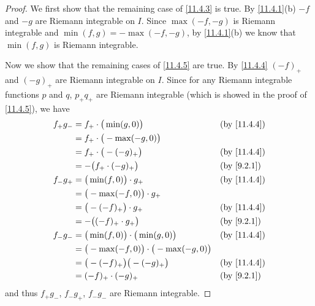 \begin{proof}
  We first show that the remaining case of \cref{11.4.3} is true.
  By \cref{11.4.1}(b) \(-f\) and \(-g\) are Riemann integrable on \(I\).
  Since \(\max(-f, -g)\) is Riemann integrable and \(\min(f, g) = -\max(-f, -g)\), by \cref{11.4.1}(b) we know that \(\min(f, g)\) is Riemann integrable.

  Now we show that the remaining cases of \cref{11.4.5} are true.
  By \cref{11.4.4} \((-f)_+\) and \((-g)_+\) are Riemann integrable on \(I\).
  Since for any Riemann integrable functions \(p\) and \(q\), \(p_+ q_+\) are Riemann integrable (which is showed in the proof of \cref{11.4.5}), we have
  \begin{align*}
    f_+ g_- & = f_+ \cdot \big(\min(g, 0)\big)                      &  & \by{11.4.4} \\
            & = f_+ \cdot \big(-\max(-g, 0)\big)                                     \\
            & = f_+ \cdot \big(-(-g)_+\big)                         &  & \by{11.4.4} \\
            & = -\big(f_+ \cdot (-g)_+\big)                         &  & \by{9.2.1}  \\
    f_- g_+ & = \big(\min(f, 0)\big) \cdot g_+                      &  & \by{11.4.4} \\
            & = \big(-\max(-f, 0)\big) \cdot g_+                                     \\
            & = \big(-(-f)_+\big) \cdot g_+                         &  & \by{11.4.4} \\
            & = -\big((-f)_+ \cdot g_+\big)                         &  & \by{9.2.1}  \\
    f_- g_- & = \big(\min(f, 0)\big) \cdot \big(\min(g, 0)\big)     &  & \by{11.4.4} \\
            & = \big(-\max(-f, 0)\big) \cdot \big(-\max(-g, 0)\big)                  \\
            & = \big(-(-f)_+\big) \big(-(-g)_+\big)                 &  & \by{11.4.4} \\
            & = (-f)_+ \cdot (-g)_+                                 &  & \by{9.2.1}
  \end{align*}
  and thus \(f_+ g_-\), \(f_- g_+\), \(f_- g_-\) are Riemann integrable.
\end{proof}
